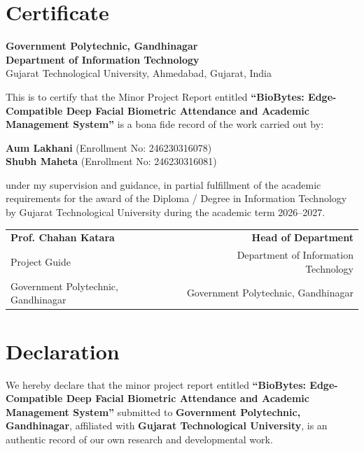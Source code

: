 \documentclass[12pt,a4paper,oneside]{report}
\begin{document}
\chapter*{Certificate}
\begin{center}
    \large
    \textbf{Government Polytechnic, Gandhinagar} \\
    \textbf{Department of Information Technology} \\
    \vspace{0.5cm}
    \normalsize
    Gujarat Technological University, Ahmedabad, Gujarat, India
\end{center}

\vspace{1.0cm}

\noindent This is to certify that the Minor Project Report entitled \textbf{``BioBytes: Edge-Compatible Deep Facial Biometric Attendance and Academic Management System''} is a bona fide record of the work carried out by:
\begin{center}
    \textbf{Aum Lakhani} \quad (Enrollment No: 246230316078) \\[0.1cm]
    \textbf{Shubh Maheta} \quad (Enrollment No: 246230316081)
\end{center}
under my supervision and guidance, in partial fulfillment of the academic requirements for the award of the Diploma / Degree in Information Technology by Gujarat Technological University during the academic term 2026--2027.

\vspace{2.5cm}

\noindent
\begin{tabularx}{\textwidth}{X r}
\textbf{Prof. Chahan Katara} & \textbf{Head of Department} \\
Project Guide & Department of Information Technology \\
Government Polytechnic, Gandhinagar & Government Polytechnic, Gandhinagar \\
\end{tabularx}

\clearpage

\chapter*{Declaration}

\noindent We hereby declare that the minor project report entitled \textbf{``BioBytes: Edge-Compatible Deep Facial Biometric Attendance and Academic Management System''} submitted to \textbf{Government Polytechnic, Gandhinagar}, affiliated with \textbf{Gujarat Technological University}, is an authentic record of our own research and developmental work.
\end{document}
